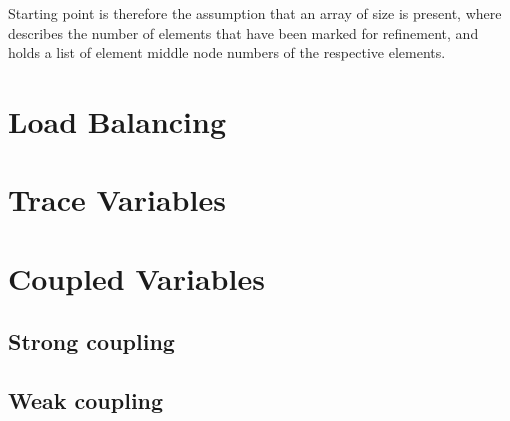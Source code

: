 Starting point is therefore the assumption that an array  of size  is present, where  describes the number of elements that have been marked for refinement, and  holds a list of element middle node numbers  of the respective elements.

\section{Load Balancing}
\label{sec:load-balancing}

\section{Trace Variables}
\label{sec:traces}

\section{Coupled Variables}
\label{sec:coupled-variables}
\subsection{Strong coupling}
\label{sec:strong-coupling}
\subsection{Weak coupling}
\label{sec:weak-coupling}

%


